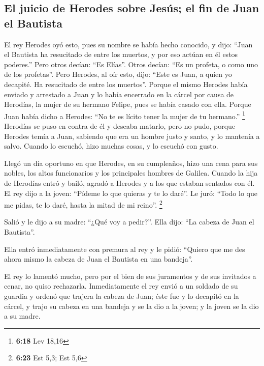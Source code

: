 \begin{paracol}{2}
\hypertarget{el-juicio-de-herodes-sobre-jesuxfas-el-fin-de-juan-el-bautista}{%
\subsection{El juicio de Herodes sobre Jesús; el fin de Juan el
Bautista}\label{el-juicio-de-herodes-sobre-jesuxfas-el-fin-de-juan-el-bautista}}

 El rey Herodes oyó esto, pues su nombre se había hecho
conocido, y dijo: ``Juan el Bautista ha resucitado de entre los muertos,
y por eso actúan en él estos poderes.''  Pero otros
decían: ``Es Elías''. Otros decían: ``Es un profeta, o como uno de los
profetas''.  Pero Herodes, al oír esto, dijo: ``Este es
Juan, a quien yo decapité. Ha resucitado de entre los muertos''.
 Porque el mismo Herodes había enviado y arrestado a Juan
y lo había encerrado en la cárcel por causa de Herodías, la mujer de su
hermano Felipe, pues se había casado con ella.  Porque
Juan había dicho a Herodes: ``No te es lícito tener la mujer de tu
hermano.'' \footnote{\textbf{6:18} Lev 18,16}  Herodías
se puso en contra de él y deseaba matarlo, pero no pudo, 
porque Herodes temía a Juan, sabiendo que era un hombre justo y santo, y
lo mantenía a salvo. Cuando lo escuchó, hizo muchas cosas, y lo escuchó
con gusto.

 Llegó un día oportuno en que Herodes, en su cumpleaños,
hizo una cena para sus nobles, los altos funcionarios y los principales
hombres de Galilea.  Cuando la hija de Herodías entró y
bailó, agradó a Herodes y a los que estaban sentados con él. El rey dijo
a la joven: ``Pídeme lo que quieras y te lo daré''.  Le
juró: ``Todo lo que me pidas, te lo daré, hasta la mitad de mi reino''.
\footnote{\textbf{6:23} Est 5,3; Est 5,6}

 Salió y le dijo a su madre: ``¿Qué voy a pedir?''. Ella
dijo: ``La cabeza de Juan el Bautista''.

 Ella entró inmediatamente con premura al rey y le pidió:
``Quiero que me des ahora mismo la cabeza de Juan el Bautista en una
bandeja''.

 El rey lo lamentó mucho, pero por el bien de sus
juramentos y de sus invitados a cenar, no quiso rechazarla.
 Inmediatamente el rey envió a un soldado de su guardia y
ordenó que trajera la cabeza de Juan; éste fue y lo decapitó en la
cárcel,  y trajo su cabeza en una bandeja y se la dio a
la joven; y la joven se la dio a su madre.


\end{paracol}
